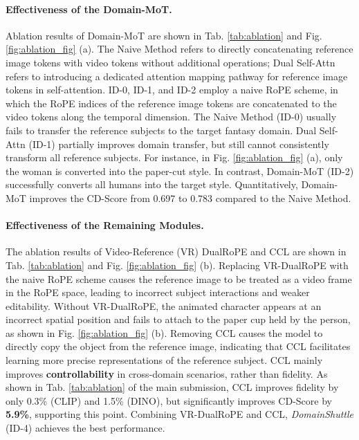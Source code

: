 \documentclass{llmxive}
\begin{document}
\paragraph{\textbf{Effectiveness of the Domain-MoT.}}  Ablation results of Domain-MoT are shown in Tab. \ref{tab:ablation} and Fig. \ref{fig:ablation_fig} (a). The Naive Method refers to directly concatenating reference image tokens with video tokens without additional operations; Dual Self-Attn refers to introducing a dedicated attention mapping pathway for reference image tokens in self-attention. ID-0, ID-1, and ID-2 employ a naive RoPE scheme, in which the RoPE indices of the reference image tokens are concatenated to the video tokens along the temporal dimension. The Naive Method (ID-0) usually fails to transfer the reference subjects to the target fantasy domain. Dual Self-Attn (ID-1) partially improves domain transfer, but still cannot consistently transform all reference subjects. For instance, in  Fig. \ref{fig:ablation_fig} (a), only the woman is converted into the paper-cut style. In contrast, Domain-MoT (ID-2) successfully converts all humans into the target style. Quantitatively, Domain-MoT improves the CD-Score from 0.697 to 0.783 compared to the Naive Method.






\paragraph{\textbf{Effectiveness of the Remaining Modules.}} The ablation results of Video-Reference (VR) DualRoPE and CCL are shown in Tab. \ref{tab:ablation} and Fig. \ref{fig:ablation_fig} (b). Replacing VR-DualRoPE with the naive RoPE scheme causes the reference image to be treated as a video frame in the RoPE space, leading to incorrect subject interactions and weaker editability. Without VR-DualRoPE, the animated character appears at an incorrect spatial position and fails to attach to the paper cup held by the person, as shown in Fig. \ref{fig:ablation_fig} (b). Removing CCL causes the model to directly copy the object from the reference image, indicating that CCL facilitates learning more precise representations of the reference subject. CCL mainly improves \textbf{controllability} in cross-domain scenarios, rather than fidelity. As shown in Tab. \ref{tab:ablation} of the main submission, CCL improves fidelity by only 0.3\% (CLIP) and 1.5\% (DINO), but significantly improves CD-Score by \textbf{5.9\%}, supporting this point. Combining VR-DualRoPE and CCL, \textit{DomainShuttle} (ID-4) achieves the best performance.
\end{document}

